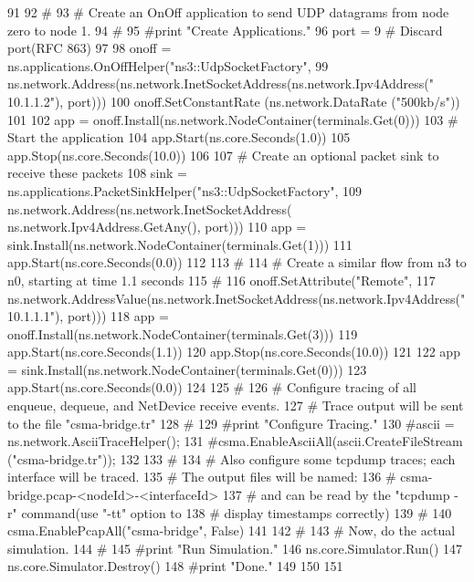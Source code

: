 \begin{DoxyCode}
91 
92     \textcolor{comment}{#}
93     \textcolor{comment}{# Create an OnOff application to send UDP datagrams from node zero to node 1.}
94     \textcolor{comment}{#}
95     \textcolor{comment}{#print "Create Applications."}
96     port = 9   \textcolor{comment}{# Discard port(RFC 863)}
97 
98     onoff = ns.applications.OnOffHelper(\textcolor{stringliteral}{"ns3::UdpSocketFactory"}, 
99                             ns.network.Address(ns.network.InetSocketAddress(ns.network.Ipv4Address(\textcolor{stringliteral}{"
      10.1.1.2"}), port)))
100     onoff.SetConstantRate (ns.network.DataRate (\textcolor{stringliteral}{"500kb/s"}))
101 
102     app = onoff.Install(ns.network.NodeContainer(terminals.Get(0)))
103     \textcolor{comment}{# Start the application}
104     app.Start(ns.core.Seconds(1.0))
105     app.Stop(ns.core.Seconds(10.0))
106 
107     \textcolor{comment}{# Create an optional packet sink to receive these packets}
108     sink = ns.applications.PacketSinkHelper(\textcolor{stringliteral}{"ns3::UdpSocketFactory"},
109                                 ns.network.Address(ns.network.InetSocketAddress(
      ns.network.Ipv4Address.GetAny(), port)))
110     app = sink.Install(ns.network.NodeContainer(terminals.Get(1)))
111     app.Start(ns.core.Seconds(0.0))
112 
113     \textcolor{comment}{# }
114     \textcolor{comment}{# Create a similar flow from n3 to n0, starting at time 1.1 seconds}
115     \textcolor{comment}{#}
116     onoff.SetAttribute(\textcolor{stringliteral}{"Remote"}, 
117                        ns.network.AddressValue(ns.network.InetSocketAddress(ns.network.Ipv4Address(\textcolor{stringliteral}{"
      10.1.1.1"}), port)))
118     app = onoff.Install(ns.network.NodeContainer(terminals.Get(3)))
119     app.Start(ns.core.Seconds(1.1))
120     app.Stop(ns.core.Seconds(10.0))
121 
122     app = sink.Install(ns.network.NodeContainer(terminals.Get(0)))
123     app.Start(ns.core.Seconds(0.0))
124 
125     \textcolor{comment}{#}
126     \textcolor{comment}{# Configure tracing of all enqueue, dequeue, and NetDevice receive events.}
127     \textcolor{comment}{# Trace output will be sent to the file "csma-bridge.tr"}
128     \textcolor{comment}{#}
129     \textcolor{comment}{#print "Configure Tracing."}
130     \textcolor{comment}{#ascii = ns.network.AsciiTraceHelper();}
131     \textcolor{comment}{#csma.EnableAsciiAll(ascii.CreateFileStream ("csma-bridge.tr"));}
132 
133     \textcolor{comment}{#}
134     \textcolor{comment}{# Also configure some tcpdump traces; each interface will be traced.}
135     \textcolor{comment}{# The output files will be named:}
136     \textcolor{comment}{#     csma-bridge.pcap-<nodeId>-<interfaceId>}
137     \textcolor{comment}{# and can be read by the "tcpdump -r" command(use "-tt" option to}
138     \textcolor{comment}{# display timestamps correctly)}
139     \textcolor{comment}{#}
140     csma.EnablePcapAll(\textcolor{stringliteral}{"csma-bridge"}, \textcolor{keyword}{False})
141 
142     \textcolor{comment}{#}
143     \textcolor{comment}{# Now, do the actual simulation.}
144     \textcolor{comment}{#}
145     \textcolor{comment}{#print "Run Simulation."}
146     ns.core.Simulator.Run()
147     ns.core.Simulator.Destroy()
148     \textcolor{comment}{#print "Done."}
149 
150 
151 
\end{DoxyCode}
